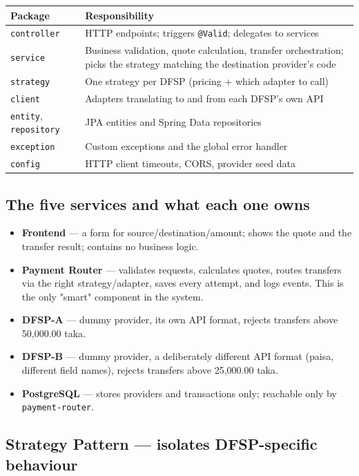 \documentclass[12pt,a4paper]{article}
\begin{document}
\begin{longtable}{L{0.20\textwidth} L{0.70\textwidth}}
\toprule
\textbf{Package} & \textbf{Responsibility} \\
\midrule
\endhead
\texttt{controller} & HTTP endpoints; triggers \texttt{@Valid}; delegates to
services \\
\texttt{service} & Business validation, quote calculation, transfer
orchestration; picks the strategy matching the destination provider's code \\
\texttt{strategy} & One strategy per DFSP (pricing + which adapter to call) \\
\texttt{client} & Adapters translating to and from each DFSP's own API \\
\texttt{entity}, \texttt{repository} & JPA entities and Spring Data repositories \\
\texttt{exception} & Custom exceptions and the global error handler \\
\texttt{config} & HTTP client timeouts, CORS, provider seed data \\
\bottomrule
\end{longtable}

\subsection{The five services and what each one owns}

\begin{itemize}
\item \textbf{Frontend} --- a form for source/destination/amount; shows the quote and
the transfer result; contains no business logic.
\item \textbf{Payment Router} --- validates requests, calculates quotes, routes
transfers via the right strategy/adapter, saves every attempt, and logs events. This
is the only "smart" component in the system.
\item \textbf{DFSP-A} --- dummy provider, its own API format, rejects transfers above
50{,}000.00 taka.
\item \textbf{DFSP-B} --- dummy provider, a deliberately different API format (paisa,
different field names), rejects transfers above 25{,}000.00 taka.
\item \textbf{PostgreSQL} --- stores providers and transactions only; reachable only
by \texttt{payment-router}.
\end{itemize}

\subsection{Strategy Pattern --- isolates DFSP-specific behaviour}
\end{document}
